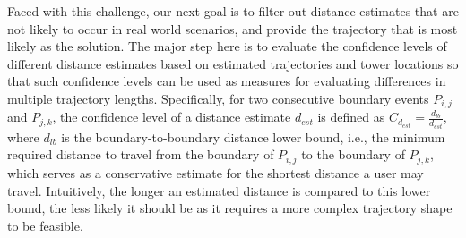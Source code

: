 Faced with this challenge, our next goal is to filter out distance estimates that are not likely to occur in real world scenarios, and provide the trajectory that is most likely as the solution. The major step here is to evaluate the confidence levels of different distance estimates based on estimated trajectories and tower locations so that such confidence levels can be used as measures for evaluating differences in multiple trajectory lengths. Specifically, for two consecutive boundary events $P_{i,j}$ and $P_{j,k}$, the confidence level of a distance estimate $d_{est}$ is defined as $C_{d_{est}} = \frac{d_{lb}}{d_{est}}$, where $d_{lb}$ is the boundary-to-boundary distance lower bound, i.e., the minimum required distance to travel from the boundary of $P_{i,j}$ to the boundary of $P_{j,k}$, which serves as a conservative estimate for the shortest distance a user may travel. Intuitively, the longer an estimated distance is compared to this lower bound, the less likely it should be as it requires a more complex trajectory shape to be feasible.


